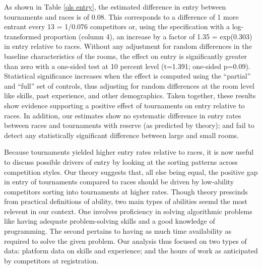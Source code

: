 \documentclass[11pt, titlepage]{article}
\begin{document}
As shown in Table \ref{ols entry}, the estimated difference in entry
between tournaments and races is of 0.08. This corresponds to a
difference of 1 more entrant every 13 = 1/0.076 competitors or, using
the specification with a log-transformed proportion (column 4), an
increase by a factor of 1.35 = exp(0.303) in entry relative to races.
Without any adjustment for random differences in the baseline
characteristics of the rooms, the effect on entry is significantly
greater than zero with a one-sided test at 10 percent level (t=1.391;
one-sided p=0.09). Statistical significance increases when the effect is
computed using the ``partial'' and ``full'' set of controls, thus
adjusting for random differences at the room level like skills, past
experience, and other demographics. Taken together, these results show
evidence supporting a positive effect of tournaments on entry relative
to races. In addition, our estimates show no systematic difference in
entry rates between races and tournaments with reserve (as predicted by
theory); and fail to detect any statistically significant difference
between large and small rooms.

Because tournaments yielded higher entry rates relative to races, it is
now useful to discuss possible drivers of entry by looking at the
sorting patterns across competition styles. Our theory suggests that,
all else being equal, the positive gap in entry of tournaments compared
to races should be driven by low-ability competitors sorting into
tournaments at higher rates. Though theory prescinds from practical
definitions of ability, two main types of abilities seemd the most
relevent in our context. One involves proficiency in solving algorithmic
problems like having adequate problem-solving skills and a good
knowledge of programming. The second pertains to having as much time
availability as required to solve the given problem. Our analysis thus
focused on two types of data: platform data on skills and experience;
and the hours of work as anticipated by competitors at registration.
\end{document}
